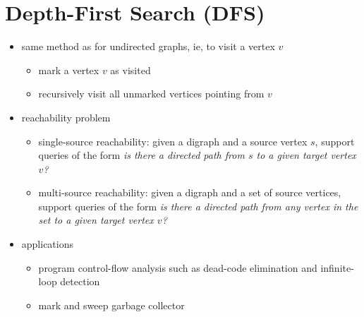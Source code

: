\documentclass[8pt,a4paper,compress]{beamer}
\begin{document}
\section{Depth-First Search (DFS)}
\begin{frame}[fragile]
\begin{itemize}
\item same method as for undirected graphs, ie, to visit a vertex $v$
\begin{itemize}
\item mark a vertex $v$ as visited

\item recursively visit all unmarked vertices pointing from $v$
\end{itemize}

\item reachability problem
\begin{itemize}
\item single-source reachability: given a digraph and a source vertex $s$, support queries of the form \emph{is there a directed path from $s$ to a given target vertex $v$?}

\item multi-source reachability: given a digraph and a set of source vertices, support queries of the form \emph{is there a directed path from any vertex in the set to a given target vertex $v$?}
\end{itemize}

\item applications
\begin{itemize}
\item program control-flow analysis such as dead-code elimination and  infinite-loop detection

\item mark and sweep garbage collector
\end{itemize}
\end{itemize}
\end{frame}
\end{document}

